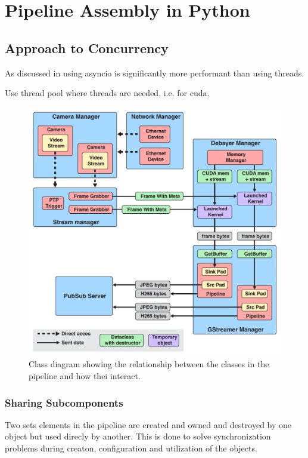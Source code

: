 
\chapter{Pipeline Assembly in Python}
\label{chap:pipeline}

\section{Approach to Concurrency}
As discussed in \todo using \gls{asyncio} is significantly more performant than using threads.

Use thread pool where threads are needed, i.e.
for \gls{cuda}.



\begin{figure}
    \centering
    \includegraphics[width=\textwidth]{figures/object_overview.pdf}
    \caption{Class diagram showing the relationship between the classes in the pipeline and how thei interact.}
    \label{fig:pipeline_current}
\end{figure}

\subsection{Sharing Subcomponents}
Two sets elements in the pipeline are created and owned and destroyed by one object but used direcly by another.
This is done to solve synchronization problems during creaton, configuration and utilization of the objects.

